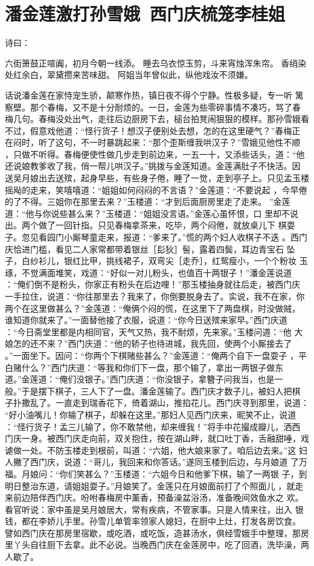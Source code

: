 \chapter{潘金莲激打孙雪娥~西门庆梳笼李桂姐}

诗曰：

六街箫鼓正喧阗，初月今朝一线添。
睡去乌衣惊玉剪，斗来宵烛浑朱帘。
香绡染处红余白，翠黛攒来苦味甜。
阿姐当年曾似此，纵他戏汝不须嫌。

话说潘金莲在家恃宠生骄，颠寒作热，镇日夜不得个宁静。性极多疑，专一听
篱察壁。那个春梅，又不是十分耐烦的。一日，金莲为些零碎事情不凑巧，骂了春
梅几句。春梅没处出气，走往后边厨房下去，槌台拍凳闹狠狠的模样。那孙雪娥看
不过，假意戏他道：“怪行货子！想汉子便别处去想，怎的在这里硬气？”春梅正
在闷时，听了这句，不一时暴跳起来：“那个歪斯缠我哄汉子？”雪娥见他性不顺
，只做不听得。春梅便使性做几步走到前边来，一五一十，又添些话头，道：“他
还说娘教爹收了我，俏一帮儿哄汉子。”挑拨与金莲知道。金莲满肚子不快活。因
送吴月娘出去送殡，起身早些，有些身子倦，睡了一觉，走到亭子上。只见孟玉楼
摇飐的走来，笑嘻嘻道：“姐姐如何闷闷的不言语？”金莲道：“不要说起
，今早倦的了不得。三姐你在那里去来？”玉楼道：“才到后面厨房里走了走来。
”金莲道：“他与你说些甚么来？”玉楼道：“姐姐没言语。”金莲心虽怀恨，口
里却不说出。两个做了一回针指。只见春梅拿茶来，吃毕，两个闷倦，就放桌儿下
棋耍子。忽见看园门小厮琴童走来，报道：“爹来了。”慌的两个妇人收棋子不迭
。西门庆恰进门槛，看见二人家常都带着银丝［髟狄］髻，露着四鬓，耳边青宝石
坠子，白纱衫儿，银红比甲，挑线裙子，双弯尖［走乔］，红鸳瘦小，一个个粉妆
玉琢，不觉满面堆笑，戏道：“好似一对儿粉头，也值百十两银子！”潘金莲说道
：“俺们倒不是粉头，你家正有粉头在后边哩！”那玉楼抽身就往后走，被西门庆
一手拉住，说道：“你往那里去？我来了，你倒要脱身去了。实说，我不在家，你
两个在这里做甚么？”金莲道：“俺俩个闷的慌，在这里下了两盘棋，时没做贼，
谁知道你就来了。”一面替他接了衣服，说道：“你今日送殡来家早。”西门庆道
：“今日斋堂里都是内相同官，天气又热，我不耐烦，先来家。”玉楼问道：“他
大娘怎的还不来？”西门庆道：“他的轿子也待进城，我先回，使两个小厮接去了
。”一面坐下。因问：“你两个下棋赌些甚么？”金莲道：“俺两个自下一盘耍子
，平白赌什么？”西门庆道：“等我和你们下一盘，那个输了，拿出一两银子做东
道。”金莲道：“俺们没银子。”西门庆道：“你没银子，拿簪子问我当，也是一
般。”于是摆下棋子，三人下了一盘。潘金莲输了。西门庆才数子儿，被妇人把棋
子扑撒乱了。一直走到瑞香花下，倚着湖山，推掐花儿。西门庆寻到那里，说道：
“好小油嘴儿！你输了棋子，却躲在这里。”那妇人见西门庆来，昵笑不止，说道
：“怪行货子！孟三儿输了，你不敢禁他，却来缠我！”将手中花撮成瓣儿，洒西
门庆一身。被西门庆走向前，双关抱住，按在湖山畔，就口吐丁香，舌融甜唾，戏
谑做一处。不防玉楼走到根前，叫道：“六姐，他大娘来家了。咱后边去来。”这
妇人撇了西门庆，说道：“哥儿，我回来和你答话。”遂同玉楼到后边，与月娘道
了万福。月娘问：“你们笑甚么？”玉楼道：“六姐今日和他爹下棋，输了一两银
子，到明日整治东道，请姐姐耍子。”月娘笑了。金莲只在月娘面前打了个照面儿
，就走来前边陪伴西门庆。吩咐春梅房中薰香，预备澡盆浴汤，准备晚间效鱼水之
欢。看官听说：家中虽是吴月娘居大，常有疾病，不管家事。只是人情来往，出入
银钱，都在李娇儿手里。孙雪儿单管率领家人媳妇，在厨中上灶，打发各房饮食。
譬如西门庆在那房里宿歇，或吃酒，或吃饭，造甚汤水，俱经雪娥手中整理，那房
里丫头自往厨下去拿。此不必说。当晚西门庆在金莲房中，吃了回酒，洗毕澡，两
人歇了。

